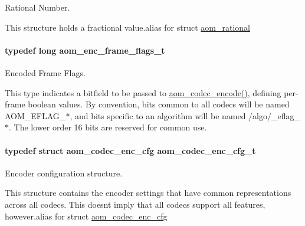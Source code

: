 Rational Number. 

This structure holds a fractional value.\+alias for struct \hyperlink{structaom__rational}{aom\+\_\+rational} 
\paragraph[{\texorpdfstring{aom\+\_\+enc\+\_\+frame\+\_\+flags\+\_\+t}{aom_enc_frame_flags_t}}]{\setlength{\rightskip}{0pt plus 5cm}typedef long {\bf aom\+\_\+enc\+\_\+frame\+\_\+flags\+\_\+t}}\hypertarget{group__encoder_gacbef92200b831adb94283f84128f83de}{}\label{group__encoder_gacbef92200b831adb94283f84128f83de}


Encoded Frame Flags. 

This type indicates a bitfield to be passed to \hyperlink{group__encoder_ga6f4a777de5389771e783df7ff1f116d4}{aom\+\_\+codec\+\_\+encode()}, defining per-\/frame boolean values. By convention, bits common to all codecs will be named A\+O\+M\+\_\+\+E\+F\+L\+A\+G\+\_\+$\ast$, and bits specific to an algorithm will be named /algo/\+\_\+eflag\+\_\+$\ast$. The lower order 16 bits are reserved for common use. 
\paragraph[{\texorpdfstring{aom\+\_\+codec\+\_\+enc\+\_\+cfg\+\_\+t}{aom_codec_enc_cfg_t}}]{\setlength{\rightskip}{0pt plus 5cm}typedef struct {\bf aom\+\_\+codec\+\_\+enc\+\_\+cfg}  {\bf aom\+\_\+codec\+\_\+enc\+\_\+cfg\+\_\+t}}\hypertarget{group__encoder_gab9627d5dcf858b7e755a5fc4a879e451}{}\label{group__encoder_gab9627d5dcf858b7e755a5fc4a879e451}


Encoder configuration structure. 

This structure contains the encoder settings that have common representations across all codecs. This doesn\textquotesingle{}t imply that all codecs support all features, however.\+alias for struct \hyperlink{structaom__codec__enc__cfg}{aom\+\_\+codec\+\_\+enc\+\_\+cfg} 

